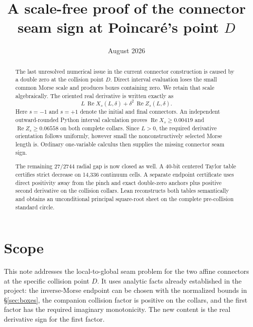 \documentclass[11pt]{article}
\title{A scale-free proof of the connector seam sign at Poincar\'e's point \(D\)}
\author{}
\date{August 2026}
\newcommand{\re}{\operatorname{Re}}
\begin{document}
\maketitle

\begin{abstract}
The last unresolved numerical issue in the current connector construction is caused by a
double zero at the collision point \(D\). Direct interval evaluation loses the small common
Morse scale and produces boxes containing zero. We retain that scale algebraically. The
oriented real derivative is written exactly as
\[
  L\,\re X_s(L,\delta)+\delta^2\,\re Z_s(L,\delta).
\]
Here \(s=-1\) and \(s=+1\) denote the initial and final connectors. An independent
outward-rounded Python interval calculation proves
\(\re X_s\geq0.00419\) and \(\re Z_s\geq0.06558\) on both complete collars.
Since \(L>0\), the required derivative orientation follows uniformly, however small the
nonconstructively selected Morse length is. Ordinary one-variable calculus then supplies
the missing connector seam sign.

The remaining $27/2744$ radial gap is now closed as well.  A 40-bit centered Taylor table
certifies strict decrease on 14,336 continuum cells.  A separate endpoint certificate uses
direct positivity away from the pinch and exact double-zero anchors plus positive second
derivative on the collision collars.  Lean reconstructs both tables semantically and obtains
an unconditional principal square-root sheet on the complete pre-collision standard circle.
\end{abstract}

\section{Scope}

This note addresses the local-to-global seam problem for the two affine connectors at the
specific collision point \(D\). It uses analytic facts already established in the project:
the inverse-Morse endpoint can be chosen with the normalized bounds in
\S\ref{sec:boxes}, the companion collision factor is positive on the collars, and the first
factor has the required imaginary monotonicity. The new content is the real derivative sign
for the first factor.
\end{document}
